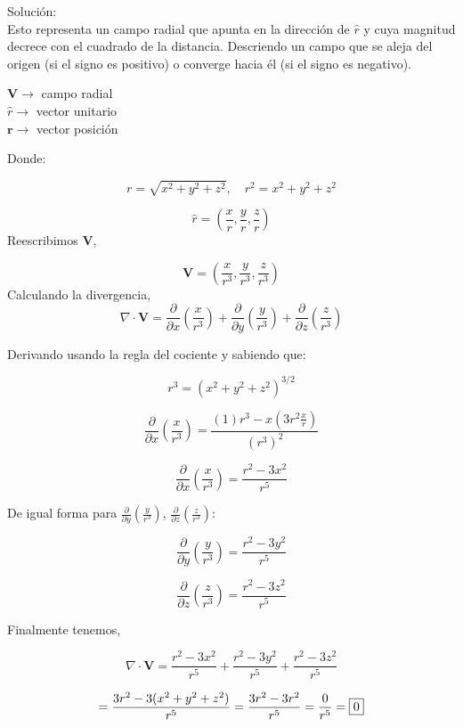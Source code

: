 \documentclass[12pt]{article}
\begin{document}
Solución: \\
Esto representa un campo radial que apunta en la dirección de \( \hat{r} \) y cuya magnitud decrece con el cuadrado de la distancia. Descriendo un campo que se aleja del origen (si el signo es positivo) o converge hacia él (si el signo es negativo).

\begin{flushleft}
$\mathbf{V} \rightarrow$ campo radial \\  
$\hat{r} \rightarrow$ vector unitario \\  
$\mathbf{r} \rightarrow$ vector posición  
\end{flushleft}

Donde:

\[
r = \sqrt{x^2 + y^2 + z^2}, \quad r^2 = x^2 + y^2 + z^2
\]

\[
\hat{r} = \left( \frac{x}{r}, \frac{y}{r}, \frac{z}{r} \right)
\]
Reescribimos $\mathbf{V}$,  

\[
\mathbf{V} = \left( \frac{x}{r^3}, \frac{y}{r^3}, \frac{z}{r^3} \right)
\]
Calculando la divergencia, 
\[
\nabla \cdot \mathbf{V} = \frac{\partial}{\partial x} \left( \frac{x}{r^3} \right) + \frac{\partial}{\partial y} \left( \frac{y}{r^3} \right) + \frac{\partial}{\partial z} \left( \frac{z}{r^3} \right)
\]

Derivando usando la regla del cociente y sabiendo que:

\[
r^3 = (x^2 + y^2 + z^2)^{3/2}
\]

\[
\frac{\partial}{\partial x} \left( \frac{x}{r^3} \right) =
\frac{(1)r^3 - x \left( 3r^2 \frac{x}{r} \right)}{(r^3)^2}
\]

\[
\frac{\partial}{\partial x} \left( \frac{x}{r^3} \right) =
\frac{r^2 - 3x^2}{r^5}
\]

De igual forma para \( \frac{\partial}{\partial y} \left( \frac{y}{r^3} \right) \), \( \frac{\partial}{\partial z} \left( \frac{z}{r^3} \right) \):

\[
\frac{\partial}{\partial y} \left( \frac{y}{r^3} \right) =
\frac{r^2 - 3y^2}{r^5}
\]

\[
\frac{\partial}{\partial z} \left( \frac{z}{r^3} \right) =
\frac{r^2 - 3z^2}{r^5}
\]

Finalmente tenemos,  

\[
\nabla \cdot \mathbf{V} =
\frac{r^2 - 3x^2}{r^5} +
\frac{r^2 - 3y^2}{r^5} +
\frac{r^2 - 3z^2}{r^5}
\]

\[
= \frac{3r^2 - 3(x^2 + y^2 + z^2)}{r^5} =
\frac{3r^2 - 3r^2}{r^5} =
\frac{0}{r^5} = \fbox{$ 0$}
\]
\end{document}
